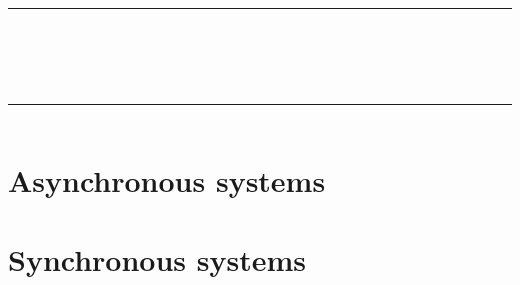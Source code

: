 \documentclass[a4paper]{article}
\title{\rule{12cm}{2pt} \vspace{5mm} \\ \Huge\firaoldstyle{Distributed algorithms:\\ a formulary} \rule{12cm}{4pt}}
\author{\Large\firalight{Mattia Setzu}}
\date{\firathin{2017}}
\begin{document}
  	\maketitle
  
  	\section{Asynchronous systems}
  	
	
  	
  	\newpage
	
  	
  	\newpage
  	\section{Synchronous systems}
  	
\end{document}
